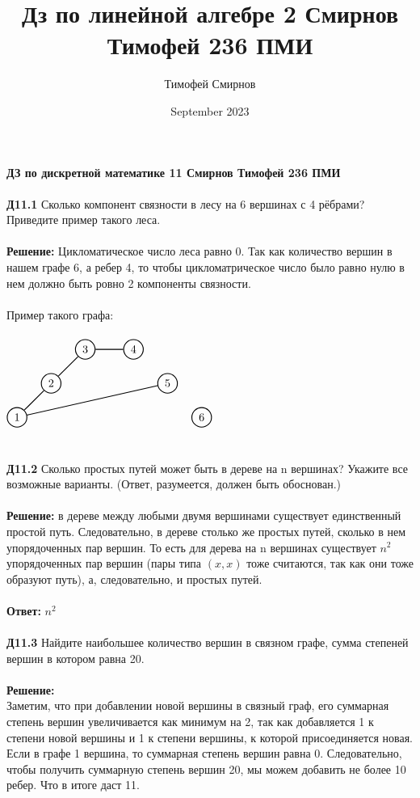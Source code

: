 \documentclass[a4paper, 12pt]{article}
\title{Дз по линейной алгебре 2 Смирнов Тимофей 236 ПМИ}
\author{Тимофей Смирнов}
\date{September 2023}
\begin{document}
    {\center \bf \large ДЗ по дискретной математике 11 Смирнов Тимофей 236 ПМИ}
    \\
    \\ \textbf{Д11.1} Сколько компонент связности в лесу на 6 вершинах с 4 рёбрами? Приведите пример такого леса.
    \\
    \\ \textbf{Решение: } Цикломатическое число леса равно 0. Так как количество вершин в нашем графе 6, а ребер 4, то чтобы цикломатрическое число было равно нулю в нем должно быть ровно 2 компоненты связности.
    \\
    \\ Пример такого графа:
    \\\\
    $\begin{tikzpicture}[node distance={15mm}, thick, main/.style = {draw, circle}] 
        \node[main] (1) {$1$}; 
        \node[main] (2) [above right of=1] {$2$}; 
        \node[main] (3) [above right of=2] {$3$}; 
        \node[main] (4) [right of=3] {$4$}; 
        \node[main] (5) [below right of=4] {$5$}; 
        \node[main] (6) [below right of=5] {$6$}; 
        \draw[-] (1) -- (2); 
        \draw[-] (3) -- (4); 
        \draw[-] (1) -- (5);
        \draw[-] (2) -- (3);
      \end{tikzpicture}$
    \\
    \\
    \\ \textbf{Д11.2} Сколько простых путей может быть в дереве на n вершинах? Укажите все возможные варианты.
    (Ответ, разумеется, должен быть обоснован.)
    \\
    \\ \textbf{Решение: } в дереве между любыми двумя вершинами существует единственный простой путь. Следовательно, в дереве столько же простых путей, сколько в нем упорядоченных пар вершин. То есть для дерева на n вершинах существует $n^2$ упорядоченных пар вершин (пары типа $(x, x)$ тоже считаются, так как они тоже образуют путь), а, следовательно, и простых путей.
    \\
    \\ \textbf{Ответ: } $n^2$
    \\
    \\ \textbf{Д11.3} Найдите наибольшее количество вершин в связном графе, сумма степеней вершин в котором равна 20.
    \\
    \\ \textbf{Решение: }
    \\ Заметим, что при добавлении новой вершины в связный граф, его суммарная степень вершин увеличивается как минимум на 2, так как добавляется 1 к степени новой вершины и 1 к степени вершины, к которой присоединяется новая. Если в графе 1 вершина, то суммарная степень вершин равна 0. Следовательно, чтобы получить суммарную степень вершин 20, мы можем добавить не более 10 ребер. Что в итоге даст 11.
\end{document}
